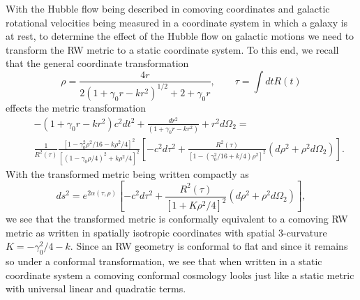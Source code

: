 \documentclass[preprint,aps]{revtex4}
\begin{document}
With the Hubble flow being described in comoving coordinates and galactic rotational velocities being measured in a coordinate system in which a galaxy is at rest, to determine the effect of the Hubble flow on galactic motions we need to transform the RW metric to a static coordinate system. To this end, we recall  \cite{Mannheim1989} that the general coordinate transformation 
%                                                                               
\begin{equation}
\rho=\frac{4r}{2(1+\gamma_0r-kr^2)^{1/2}+2 +\gamma_0 r},\qquad \tau=\int dt R(t)
\label{E11}
\end{equation}                                 
%
effects the metric transformation 
% 
\begin{eqnarray}
&&-(1+\gamma_0r-kr^2)c^2dt^2+\frac{dr^2}{(1+\gamma_0r-kr^2)}+r^2d\Omega_2=
\nonumber \\
&&\frac{1}{R^2(\tau)}\frac{[1-\gamma_0^2\rho^2/16-k\rho^2/4]^2}
{[(1-\gamma_0\rho/4)^2+k\rho^2/4]^2}
\left[-c^2d\tau^2+\frac{R^2(\tau)}{[1-(\gamma_0^2/16+k/4)\rho^2]^2}
\left(d\rho^2+\rho^2d\Omega_2\right)\right].
\label{E12}
\end{eqnarray} 
%
With the transformed metric being written compactly as 
%                                                                               
\begin{equation}
ds^2=e^{2\alpha(\tau,\rho)}\left[-c^2d\tau^2+\frac{R^2(\tau)}{[1+K\rho^2/4]^2}
\left(d\rho^2+\rho^2d\Omega_2\right)\right],
\label{E13}
\end{equation}                                 
%
we see that the transformed metric is conformally equivalent  to a comoving RW metric as written in spatially isotropic coordinates with spatial 3-curvature $K=-\gamma_0^2/4-k$. Since an RW geometry is conformal to flat and since it remains so under a conformal transformation, we see that when written in a static coordinate system a comoving conformal cosmology  looks just like a static metric with universal linear and quadratic terms. 
\end{document}
